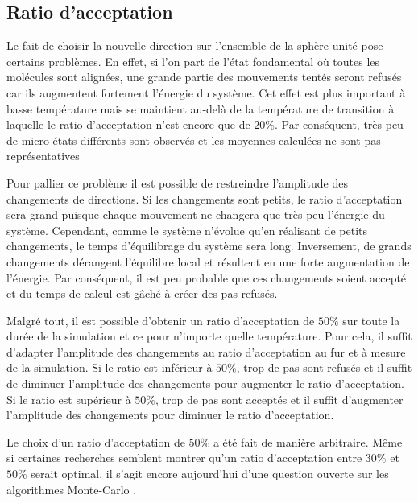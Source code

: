 \documentclass[11pt,a4paper]{article}
\numberwithin{equation}{section}
\begin{document}
\subsection{Ratio d'acceptation}
Le fait de choisir la nouvelle direction sur l'ensemble de la sphère unité pose certains problèmes. En effet, si l'on part de l'état fondamental où toutes les molécules sont alignées, une grande partie des mouvements tentés seront refusés car ils augmentent fortement l'énergie du système. Cet effet est plus important à basse température mais se maintient au-delà de la température de transition à laquelle le ratio d'acceptation n'est encore que de $20\%$. Par conséquent, très peu de micro-états différents sont observés et les moyennes calculées ne sont pas représentatives
\medskip

Pour pallier ce problème il est possible de restreindre l'amplitude des changements de directions. Si les changements sont petits, le ratio d'acceptation sera grand puisque chaque mouvement ne changera que très peu l'énergie du système. Cependant, comme le système n'évolue qu'en réalisant de petits changements, le temps d'équilibrage du système sera long. Inversement, de grands changements dérangent l'équilibre local et résultent en une forte augmentation de l'énergie. Par conséquent, il est peu probable que ces changements soient accepté et du temps de calcul est gâché à créer des pas refusés.
\medskip

Malgré tout, il est possible d'obtenir un ratio d'acceptation de $50\%$ sur toute la durée de la simulation et ce pour n'importe quelle température. Pour cela, il suffit d'adapter l'amplitude des changements au ratio d'acceptation au fur et à mesure de la simulation. Si le ratio est inférieur à $50\%$, trop de pas sont refusés et il suffit de diminuer l'amplitude des changements pour augmenter le ratio d'acceptation. Si le ratio est supérieur à $50\%$, trop de pas sont acceptés et il suffit d'augmenter l'amplitude des changements pour diminuer le ratio d'acceptation. 
\medskip

Le choix d'un ratio d'acceptation de $50\%$ a été fait de manière arbitraire. Même si certaines recherches \cite{acceptanceratio} semblent montrer qu'un ratio d'acceptation entre $30\%$ et $50\%$ serait optimal, il s'agit encore aujourd'hui d'une question ouverte sur les algorithmes Monte-Carlo \cite{acceptanceratio1}.
\end{document}
